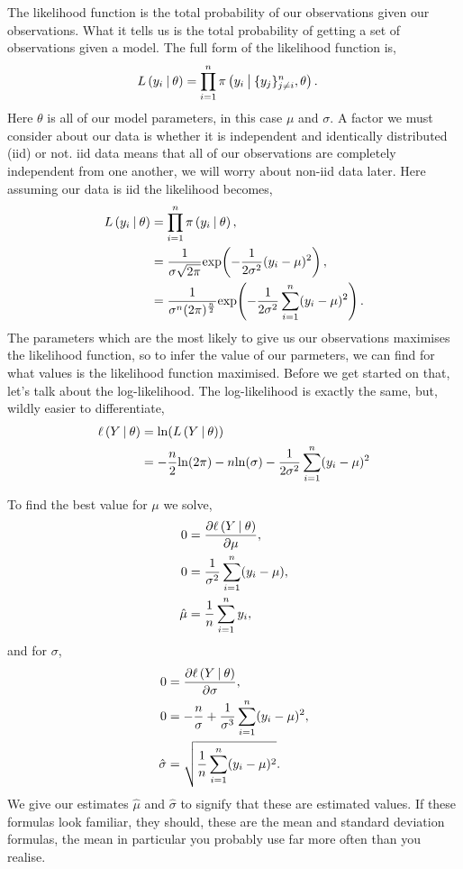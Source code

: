 The likelihood function is the total probability of our observations given our observations. What it tells us is the total probability of getting a set of observations given a model. The full form of the likelihood function is,
\begin{align}
    L\left( y_i \:\middle|\: \theta \right) &= \prod_{i=1}^{n} \pi \left( y_i \:\middle|\: \{y_j\}^n_{j \neq i}, \theta \right).
\end{align}
Here $\theta$ is all of our model parameters, in this case $\mu$ and $\sigma$. A factor we must consider about our data is whether it is independent and identically distributed (iid) or not. iid data means that all of our observations are completely independent from one another, we will worry about non-iid data later. Here assuming our data is iid the likelihood becomes,
\begin{align*}
    L\left( y_i \:\middle|\: \theta \right) &= \prod_{i=1}^{n} \pi \left( y_i \:\middle|\: \theta \right),\\
    &= \frac{1}{\sigma\sqrt{2\pi}}\mathrm{exp}\!\left( -\frac{1}{2\sigma^2}(y_i-\mu)^2 \right),\\
    &= \frac{1}{\sigma^n(2\pi)^\frac{n}{2}}\mathrm{exp}\!\left( -\frac{1}{2\sigma^2}\sum_{i=1}^{n}(y_i-\mu)^2 \right).
\end{align*}
The parameters which are the most likely to give us our observations maximises the likelihood function, so to infer the value of our parmeters, we can find for what values is the likelihood function maximised. Before we get started on that, let's talk about the log-likelihood. The log-likelihood is exactly the same, but, wildly easier to differentiate,
\begin{align*}
    \ell\left( Y \:\middle|\: \theta \right) &= \mathrm{ln}\!\left( L\left( Y \:\middle|\: \theta \right) \right)\\
    &= -\frac{n}{2}\mathrm{ln}\!\left( 2\pi \right)-n\mathrm{ln}\!\left( \sigma \right)-\frac{1}{2\sigma^2}\sum_{i=1}^{n}(y_i-\mu)^2
\end{align*}

To find the best value for $\mu$ we solve,
\begin{align*}
    0 &= \dfrac{\partial \ell\left( Y \:\middle|\: \theta \right)}{\partial \mu},\\
    0 &= \frac{1}{\sigma^2}\sum_{i=1}^{n} (y_i-\mu),\\
    \hat{\mu} &= \frac{1}{n}\sum_{i=1}^{n} y_i,
\end{align*}
and for $\sigma$,
\begin{align*}
    0 &= \dfrac{\partial \ell\left( Y \:\middle|\: \theta \right)}{\partial \sigma},\\
    0 &= -\frac{n}{\sigma} + \frac{1}{\sigma^3} \sum_{i=1}^{n} (y_i-\mu)^2,\\
    \hat{\sigma} &= \sqrt{\frac{1}{n}\sum_{i=1}^{n} (y_i-\mu)^2}.
\end{align*}
We give our estimates $\hat{\mu}$ and $\hat{\sigma}$ to signify that these are estimated values. If these formulas look familiar, they should, these are the mean and standard deviation formulas, the mean in particular you probably use far more often than you realise.

